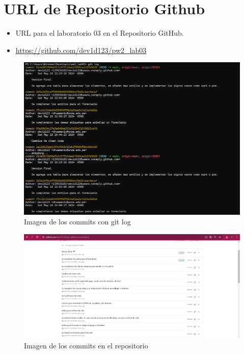 \documentclass{article}
\begin{document}
	\section{URL de Repositorio Github}
	\begin{itemize}
		\item URL para el laboratorio 03 en el Repositorio GitHub.
		\item \url{https://github.com/dev1d123/pw2_lab03}
	\end{itemize}
	        		\begin{figure}[H]
            \centering
            \includegraphics[width=\textwidth]{img/commit1}
            \caption{Imagen de los commits con git log}
            \label{fig:pagina}
        \end{figure}
        		\begin{figure}[H]
            \centering
            \includegraphics[width=\textwidth]{img/commit2}
            \caption{Imagen de los commits en el repositorio}
            \label{fig:pagina}
        \end{figure}
\end{document}
